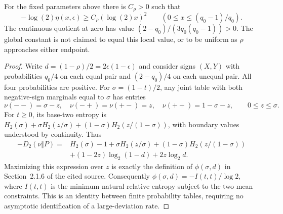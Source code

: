 \begin{lemma}
\label{lem:327-modulus}
For the fixed parameters above there is $C_\rho>0$ such that
\[
 -\log(2)\eta(x,\epsilon)\geq C_\rho(\log(2)x)^2
 \qquad (0\leq x\leq(q_0-1)/q_0).
\]
The continuous quotient at zero has value
$(2-q_0)/(3q_0(q_0-1))>0$. The global constant is not claimed to equal
this local value, or to be uniform as $\rho$ approaches either endpoint.
\end{lemma}
\begin{proof}
Write $d=(1-\rho)/2=2\epsilon(1-\epsilon)$ and consider signs $(X,Y)$
with probabilities $q_0/4$ on each equal pair and $(2-q_0)/4$ on each
unequal pair. All four probabilities are positive. For
$\sigma=(1-t)/2$, any joint table with both negative-sign marginals
equal to $\sigma$ has entries
\[
 \nu(--)=\sigma-z,\quad \nu(-+)=\nu(+-)=z,\quad
 \nu(++)=1-\sigma-z,\qquad 0\leq z\leq\sigma.
\]
For $t\geq0$, its base-two entropy is
$H_2(\sigma)+\sigma H_2(z/\sigma)+(1-\sigma)H_2(z/(1-\sigma))$,
with boundary values understood by continuity. Thus
\begin{align*}
 -D_2(\nu\Vert P)={}&H_2(\sigma)-1
   +\sigma H_2(z/\sigma)+(1-\sigma)H_2(z/(1-\sigma))\\
 &+(1-2z)\log_2(1-d)+2z\log_2d.
\end{align*}
Maximizing this expression over $z$ is exactly the definition of
$\phi(\sigma,d)$ in Section~2.1.6 of the cited source. Consequently
$\phi(\sigma,d)=-I(t,t)/\log2$, where $I(t,t)$ is the minimum natural
relative entropy subject to the two mean constraints. This is an identity
between finite probability tables, requiring no asymptotic identification
of a large-deviation rate.


\end{proof}
